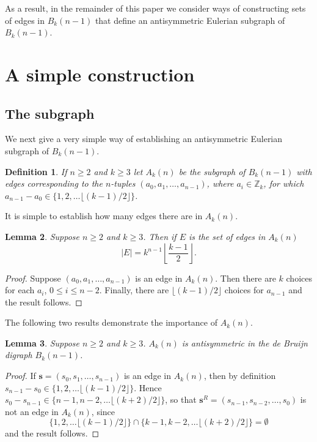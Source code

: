 \documentclass[a4paper,11pt]{article}
\newtheorem{lemma}{Lemma}[section]
\newtheorem{definition}[lemma]{Definition}
\begin{document}
As a result, in the remainder of this paper we consider ways of constructing sets of edges in
$B_{k}(n-1)$ that define an antisymmetric Eulerian subgraph of $B_{k}(n-1)$.

\section{A simple construction}  \label{section:construction}

\subsection{The subgraph}

We next give a very simple way of establishing an antisymmetric Eulerian subgraph of $B_{k}(n-1)$.

\begin{definition}  \label{definition:A_n(k)}
If $n\geq2$ and $k\geq3$ let $A_k(n)$ be the subgraph of $B_{k}(n-1)$ with edges corresponding to
the $n$-tuples $(a_0,a_1,\ldots,a_{n-1})$, where $a_i\in\mathbb{Z}_k$, for which
$a_{n-1}-a_0\in\{1,2,\ldots\lfloor(k-1)/2\rfloor\}$.
\end{definition}

It is simple to establish how many edges there are in $A_k(n)$.

\begin{lemma}  \label{lemma:Akn}
Suppose $n\geq2$ and $k\geq3$.  Then if $E$ is the set of edges in $A_k(n)$
\[ |E|= k^{n-1}\left\lfloor\frac{k-1}{2}\right\rfloor.\]
\end{lemma}

\begin{proof}
Suppose $(a_0,a_1,\ldots,a_{n-1})$ is an edge in $A_k(n)$.  Then there are $k$ choices for each
$a_i$, $0\leq i\leq n-2$.  Finally, there are $\lfloor(k-1)/2\rfloor$ choices for $a_{n-1}$ and
the
result follows.
\end{proof}

The following two results demonstrate the importance of $A_k(n)$.

\begin{lemma}  \label{lemma:tuples}
Suppose $n\geq2$ and $k\geq3$.  $A_k(n)$ is antisymmetric in the de Bruijn digraph $B_{k}(n-1)$.
\end{lemma}

\begin{proof}
If $\mathbf{s}=(s_0,s_1,\ldots,s_{n-1})$ is an edge in $A_k(n)$, then by definition
$s_{n-1}-s_0\in\{1,2,\ldots\lfloor(k-1)/2\rfloor\}$.  Hence
$s_0-s_{n-1}\in\{n-1,n-2,\ldots\lfloor(k+2)/2\rfloor\}$, so that $\mathbf{s}^R=(s_{n-1},s_{n-2},\ldots,s_0)$ is not an edge in $A_k(n)$, since
\[ \{1,2,\ldots\lfloor(k-1)/2\rfloor\}\cap\{k-1,k-2,\ldots\lfloor(k+2)/2\rfloor\}=\emptyset \]
and the result follows.
\end{proof}
\end{document}
